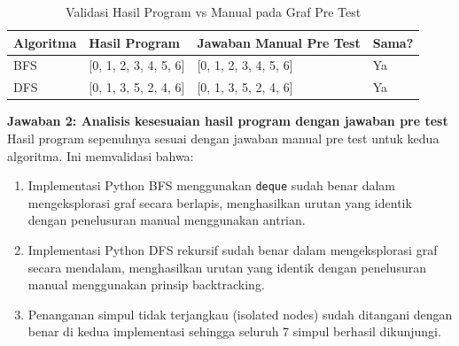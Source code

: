 \begin{table}[H]
    \centering
    \caption{Validasi Hasil Program vs Manual pada Graf Pre Test}
    \begin{tabular}{lllp{1.5cm}}
    \toprule
    \textbf{Algoritma} & \textbf{Hasil Program} & \textbf{Jawaban Manual Pre Test} & \textbf{Sama?} \\ \midrule
    BFS & [0, 1, 2, 3, 4, 5, 6] & [0, 1, 2, 3, 4, 5, 6] & Ya \\
    DFS & [0, 1, 3, 5, 2, 4, 6] & [0, 1, 3, 5, 2, 4, 6] & Ya \\ \bottomrule
    \end{tabular}
\end{table}

\textbf{Jawaban 2: Analisis kesesuaian hasil program dengan jawaban pre test}\\
Hasil program sepenuhnya sesuai dengan jawaban manual pre test untuk kedua algoritma. Ini memvalidasi bahwa:
\begin{enumerate}
    \item Implementasi Python BFS menggunakan \texttt{deque} sudah benar dalam mengeksplorasi graf secara berlapis, menghasilkan urutan yang identik dengan penelusuran manual menggunakan antrian.
    \item Implementasi Python DFS rekursif sudah benar dalam mengeksplorasi graf secara mendalam, menghasilkan urutan yang identik dengan penelusuran manual menggunakan prinsip backtracking.
    \item Penanganan simpul tidak terjangkau (isolated nodes) sudah ditangani dengan benar di kedua implementasi sehingga seluruh 7 simpul berhasil dikunjungi.
\end{enumerate}